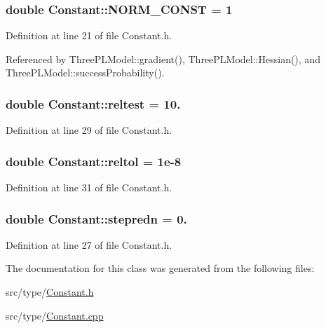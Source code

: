 \subsubsection[{N\+O\+R\+M\+\_\+\+C\+O\+N\+S\+T}]{\setlength{\rightskip}{0pt plus 5cm}double Constant\+::\+N\+O\+R\+M\+\_\+\+C\+O\+N\+S\+T = 1\hspace{0.3cm}{\ttfamily [static]}}\label{classConstant_aaf334273fc82a586936f00df7ec30149}


Definition at line 21 of file Constant.\+h.



Referenced by Three\+P\+L\+Model\+::gradient(), Three\+P\+L\+Model\+::\+Hessian(), and Three\+P\+L\+Model\+::success\+Probability().

\hypertarget{classConstant_a3aefd0d2fdfb90049600c25ebcaa41e1}{}
\subsubsection[{reltest}]{\setlength{\rightskip}{0pt plus 5cm}double Constant\+::reltest = 10.\hspace{0.3cm}{\ttfamily [static]}}\label{classConstant_a3aefd0d2fdfb90049600c25ebcaa41e1}


Definition at line 29 of file Constant.\+h.

\hypertarget{classConstant_a46062856afe6595162139069f1157d64}{}
\subsubsection[{reltol}]{\setlength{\rightskip}{0pt plus 5cm}double Constant\+::reltol = 1e-\/8\hspace{0.3cm}{\ttfamily [static]}}\label{classConstant_a46062856afe6595162139069f1157d64}


Definition at line 31 of file Constant.\+h.

\hypertarget{classConstant_acc69323a1f124d4b8ed7257e0574a9eb}{}
\subsubsection[{stepredn}]{\setlength{\rightskip}{0pt plus 5cm}double Constant\+::stepredn = 0.\hspace{0.3cm}{\ttfamily [static]}}\label{classConstant_acc69323a1f124d4b8ed7257e0574a9eb}


Definition at line 27 of file Constant.\+h.



The documentation for this class was generated from the following files\+:\begin{DoxyCompactItemize}
\item 
src/type/\hyperlink{Constant_8h}{Constant.\+h}\item 
src/type/\hyperlink{Constant_8cpp}{Constant.\+cpp}\end{DoxyCompactItemize}
